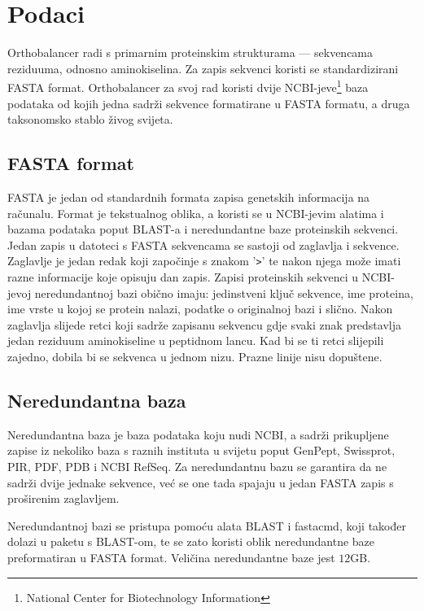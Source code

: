 \chapter{Podaci}
\label{chap:podaci}

Orthobalancer radi s primarnim proteinskim strukturama --- sekvencama
reziduuma, odnosno aminokiselina. Za zapis sekvenci koristi se standardizirani
FASTA format. Orthobalancer za svoj rad koristi dvije
NCBI-jeve\footnote{National Center for Biotechnology Information} baza
podataka od kojih jedna sadrži sekvence formatirane u FASTA formatu, a druga
taksonomsko stablo živog svijeta.


\section{FASTA format}
\label{sec:fasta}

FASTA je jedan od standardnih formata zapisa genetskih informacija na računalu.
Format je tekstualnog oblika, a koristi se u NCBI-jevim alatima i bazama
podataka poput BLAST-a i neredundantne baze proteinskih sekvenci. Jedan zapis u
datoteci s FASTA sekvencama se sastoji od zaglavlja i sekvence. Zaglavlje je
jedan redak koji započinje s znakom '\texttt{>}' te nakon njega može imati razne
informacije koje opisuju dan zapis. Zapisi proteinskih sekvenci u NCBI-jevoj
neredundantnoj bazi obično imaju: jedinstveni ključ sekvence, ime proteina, ime
vrste u kojoj se protein nalazi, podatke o originalnoj bazi i slično. Nakon
zaglavlja slijede retci koji sadrže zapisanu sekvencu gdje svaki znak
predstavlja jedan reziduum aminokiseline u peptidnom lancu. Kad bi se ti retci
slijepili zajedno, dobila bi se sekvenca u jednom nizu. Prazne linije nisu
dopuštene.


\section{Neredundantna baza}
\label{sec:nrdb}

Neredundantna baza je baza podataka koju nudi NCBI, a sadrži prikupljene zapise
iz nekoliko baza s raznih instituta u svijetu poput GenPept, Swissprot, PIR,
PDF, PDB i NCBI RefSeq. Za neredundantnu bazu se garantira da ne sadrži dvije
jednake sekvence, već se one tada spajaju u jedan FASTA zapis s proširenim
zaglavljem.

Neredundantnoj bazi se pristupa pomoću alata BLAST\cite{altschul1997gapped} i
fastacmd, koji također dolazi u paketu s BLAST-om, te se zato koristi oblik
neredundantne baze preformatiran u FASTA format. Veličina neredundantne baze
jest $12$GB.


